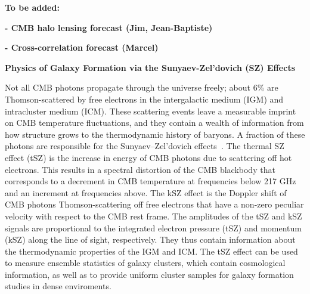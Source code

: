 \documentclass[PICOReport.tex]{subfiles}
\begin{document}
{\textbf{To be added:}

\textbf{- CMB halo lensing forecast (Jim, Jean-Baptiste)}

\textbf{- Cross-correlation forecast (Marcel)}


{\bf Physics of Galaxy Formation via the Sunyaev-Zel'dovich (SZ) Effects}

Not all CMB photons propagate through the universe freely; about 6\% are Thomson-scattered by free electrons in the intergalactic medium (IGM) and intracluster medium (ICM). These scattering events leave a measurable imprint on CMB temperature fluctuations, and they contain a wealth of information from how structure grows to the thermodynamic history of baryons. A fraction of these photons are responsible for the Sunyaev--Zel'dovich effects~\citep{SZ1969,SZ1972}. The thermal SZ effect (tSZ) is the increase in energy of CMB photons due to scattering off hot electrons. This results in a spectral distortion
 of the CMB blackbody that corresponds to a decrement in CMB temperature at frequencies below 217 GHz and an increment at frequencies above. The kSZ effect is the Doppler shift of CMB photons Thomson-scattering off free electrons that have a non-zero peculiar velocity with respect to the CMB rest frame. 
The amplitudes of the tSZ and kSZ signals are proportional to the integrated electron pressure (tSZ) and momentum (kSZ) along the line of sight, respectively.  They thus contain information about the thermodynamic properties of the IGM and ICM.
The tSZ effect can be used to measure ensemble statistics of galaxy clusters, which contain cosmological information, as well as to provide uniform cluster samples for galaxy formation studies in dense enviroments.
%

}
\end{document}
